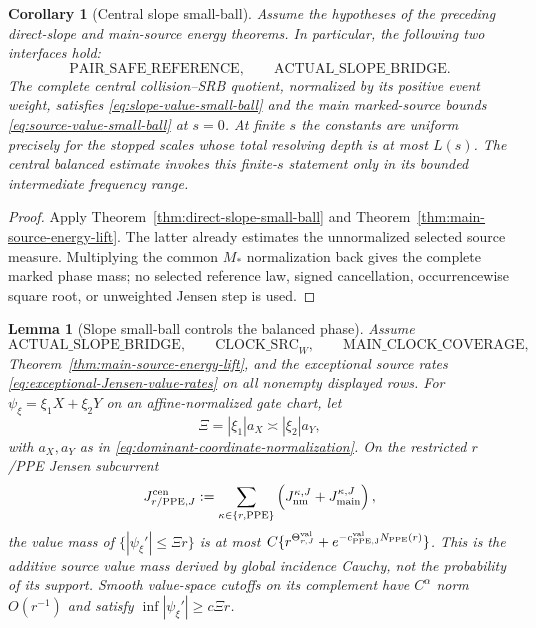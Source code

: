 \documentclass[11pt]{article}
\newtheorem{lemma}[theorem]{Lemma}
\newtheorem{corollary}[theorem]{Corollary}
\begin{document}
\begin{corollary}[Central slope small-ball]
\label{cor:central-g2}
Assume the hypotheses of the preceding direct-slope and main-source energy
theorems.  In particular, the following two interfaces hold:
\[
 \mathrm{PAIR\_SAFE\_REFERENCE},
 \qquad
 \mathrm{ACTUAL\_SLOPE\_BRIDGE}.
\]
The complete central collision--SRB quotient, normalized by its positive
event weight, satisfies
\eqref{eq:slope-value-small-ball} and the main marked-source bounds
\eqref{eq:source-value-small-ball} at $s=0$.  At finite $s$ the constants are
uniform precisely for the stopped scales whose total resolving depth is at
most $L(s)$.  The central balanced estimate invokes this finite-$s$
statement only in its bounded intermediate frequency range.
\end{corollary}

\begin{proof}
Apply Theorem~\ref{thm:direct-slope-small-ball} and
Theorem~\ref{thm:main-source-energy-lift}.  The latter already estimates the
unnormalized selected source measure.  Multiplying the common $M_*$
normalization back gives the complete marked phase mass; no selected
reference law, signed cancellation, occurrencewise square root, or
unweighted Jensen step is used.
\end{proof}

\begin{lemma}[Slope small-ball controls the balanced phase]
\label{lem:slope-good-bad-phase}
Assume
\[
 \mathrm{ACTUAL\_SLOPE\_BRIDGE},\qquad
 \mathrm{CLOCK\_SRC}_{W},\qquad
 \mathrm{MAIN\_CLOCK\_COVERAGE},
\]
Theorem~\ref{thm:main-source-energy-lift}, and the exceptional source rates
\eqref{eq:exceptional-Jensen-value-rates} on all nonempty displayed rows.
For $\psi_\xi=\xi_1X+\xi_2Y$ on an affine-normalized gate chart, let
\begin{equation}
\label{eq:balanced-physical-frequency}
 \Xi=|\xi_1|a_X\asymp|\xi_2|a_Y,
\end{equation}
with $a_X,a_Y$ as in \eqref{eq:dominant-coordinate-normalization}.  On the
restricted $r$/PPE Jensen subcurrent
\[
 J_{r/{\rm PPE},J}^{\rm cen}:=
 \sum_{\kappa\in\{r,{\rm PPE}\}}
 \left(J_{\rm nm}^{\kappa,J}+J_{\rm main}^{\kappa,J}\right),
\]
the value mass of
$\{|\psi_\xi'|\le\Xi r\}$ is at most
$C\{r^{\Theta_{r,J}^{\rm val}}
+e^{-c_{\rm PPE,J}^{\rm val}N_{\rm PPE}(r)}\}$.  This is the additive
source value mass derived by global incidence Cauchy, not the probability of
its support.  Smooth value-space cutoffs on its complement have
$C^\alpha$ norm $O(r^{-1})$ and satisfy
$\inf|\psi_\xi'|\ge c\Xi r$.
\end{lemma}
\end{document}
